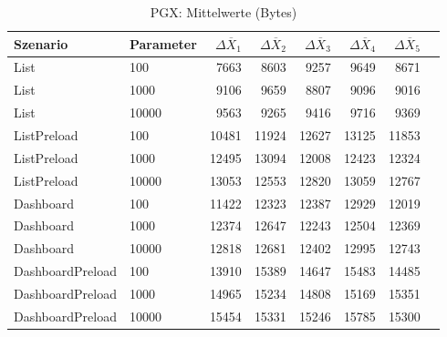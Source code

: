 
\begin{table}[ht]
\setlength{\extrarowheight}{-1pt}
\centering
\caption{PGX: Mittelwerte (Bytes)}
\begin{tabular}{llrrrrrr}
\toprule
Szenario & Parameter & ${\Delta \overline{X}_1}$ & ${\Delta \overline{X}_2}$ & ${\Delta \overline{X}_3}$ & ${\Delta \overline{X}_4}$ & ${\Delta \overline{X}_5}$ \\
\midrule
	List & 100 & 7663 & 8603 & 9257 & 9649 & 8671 \\
	List & 1000 & 9106 & 9659 & 8807 & 9096 & 9016 \\
	List & 10000 & 9563 & 9265 & 9416 & 9716 & 9369 \\
	ListPreload & 100 & 10481 & 11924 & 12627 & 13125 & 11853 \\
	ListPreload & 1000 & 12495 & 13094 & 12008 & 12423 & 12324 \\
	ListPreload & 10000 & 13053 & 12553 & 12820 & 13059 & 12767 \\
	Dashboard & 100 & 11422 & 12323 & 12387 & 12929 & 12019 \\
	Dashboard & 1000 & 12374 & 12647 & 12243 & 12504 & 12369 \\
	Dashboard & 10000 & 12818 & 12681 & 12402 & 12995 & 12743 \\
	DashboardPreload & 100 & 13910 & 15389 & 14647 & 15483 & 14485 \\
	DashboardPreload & 1000 & 14965 & 15234 & 14808 & 15169 & 15351 \\
	DashboardPreload & 10000 & 15454 & 15331 & 15246 & 15785 & 15300 \\
\bottomrule
\end{tabular}
\label{tab:mittelwerte_pgx_bytes}
\end{table}
	